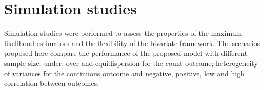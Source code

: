 \documentclass[useAMS,referee]{biom}
\begin{document}
%		
%		




\section{Simulation studies}\label{Simulation}

Simulation studies were performed to assess the properties of the maximum likelihood estimators and the flexibility of the bivariate framework. The scenarios proposed here compare the performance of the proposed model with different sample size; under, over and equidispersion for the count outcome; heterogeneity of variances for the continuous outcome and negative, positive, low and high correlation between outcomes.
\end{document}
